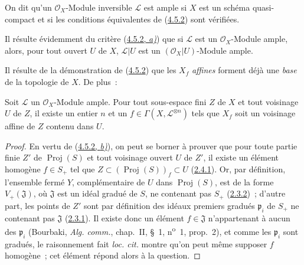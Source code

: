 \begin{definition}[4.5.3]
\label{II.4.5.3-fr}
On dit qu'un $\mathcal{O}_X$-Module inversible $\mathcal{L}$ est \textup{ample} si
$X$ est un schéma quasi-compact et si les conditions équivalentes de
\textup{(\hyperref[II.4.5.2-fr]{4.5.2})} sont vérifiées.
\end{definition}

Il résulte évidemment du critère (\hyperref[II.4.5.2-fr]{4.5.2, \emph{a)}}) que si
$\mathcal{L}$ est un $\mathcal{O}_X$-Module ample, alors, pour tout ouvert
$U$ de $X$, $\mathcal{L}|U$ est un $(\mathcal{O}_X|U)$-Module ample.

Il résulte de la démonstration de (\hyperref[II.4.5.2-fr]{4.5.2}) que les
$X_f$ \emph{affines} forment déjà une \emph{base} de la topologie de $X$. De plus~:

\begin{corollary}[4.5.4]
\label{II.4.5.4-fr}
Soit $\mathcal{L}$ un $\mathcal{O}_X$-Module ample. Pour tout sous-espace fini
$Z$ de $X$ et tout voisinage $U$ de $Z$, il existe un entier $n$ et un
$f\in\Gamma(X,\mathcal{L}^{\otimes n})$ tels que $X_f$ soit un voisinage
affine de $Z$ contenu dans $U$.
\end{corollary}

\begin{proof}

En vertu de (\hyperref[II.4.5.2-fr]{4.5.2, \emph{b)}}), on peut se borner à prouver
que pour toute partie finie $Z'$ de $\operatorname{Proj}(S)$ et tout
voisinage ouvert $U$ de $Z'$, il existe un élément homogène $f\in S_+$ tel
que $Z\subset(\operatorname{Proj}(S))_f\subset U$
(\hyperref[II.2.4.1-fr]{2.4.1}). Or, par définition, l'ensemble fermé $Y$,
complémentaire de $U$ dans $\operatorname{Proj}(S)$, est de la forme
$V_+(\mathfrak{J})$, où $\mathfrak{J}$ est un idéal gradué de $S$, ne
contenant pas $S_+$ (\hyperref[II.2.3.2-fr]{2.3.2})~; d'autre part, les
points de $Z'$ sont par définition des idéaux premiers gradués
$\mathfrak{p}_i$ de $S_+$ ne contenant pas $\mathfrak{J}$
(\hyperref[II.2.3.1-fr]{2.3.1}). Il existe donc un élément
$f\in\mathfrak{J}$ n'appartenant à aucun des $\mathfrak{p}_i$ (Bourbaki,
\emph{Alg. comm.}, chap.~II, \S~1, n\textsuperscript{o}~1, prop.~2), et comme
les $\mathfrak{p}_i$ sont gradués, le raisonnement fait \emph{loc. cit.}
montre qu'on peut même supposer $f$ homogène~; cet élément répond alors à la
question.
\end{proof}

